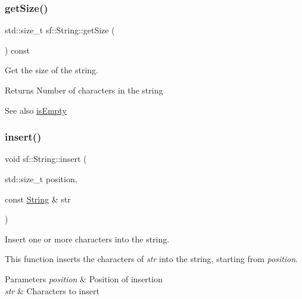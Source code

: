\subsubsection{\texorpdfstring{getSize()}{getSize()}}
{\footnotesize\ttfamily std\+::size\+\_\+t sf\+::\+String\+::get\+Size (\begin{DoxyParamCaption}{ }\end{DoxyParamCaption}) const}



Get the size of the string. 

\begin{DoxyReturn}{Returns}
Number of characters in the string
\end{DoxyReturn}
\begin{DoxySeeAlso}{See also}
\mbox{\hyperlink{classsf_1_1_string_a2ba26cb6945d2bbb210b822f222aa7f6}{is\+Empty}} \begin{DoxyVerb}\end{DoxyVerb}
 
\end{DoxySeeAlso}
\mbox{\label{classsf_1_1_string_ad0b1455deabf07af13ee79812e05fa02}} 
\subsubsection{\texorpdfstring{insert()}{insert()}}
{\footnotesize\ttfamily void sf\+::\+String\+::insert (\begin{DoxyParamCaption}\item[{std\+::size\+\_\+t}]{position,  }\item[{const \mbox{\hyperlink{classsf_1_1_string}{String}} \&}]{str }\end{DoxyParamCaption})}



Insert one or more characters into the string. 

This function inserts the characters of {\itshape str} into the string, starting from {\itshape position}.


\begin{DoxyParams}{Parameters}
{\em position} & Position of insertion \\
\hline
{\em str} & Characters to insert \begin{DoxyVerb}\end{DoxyVerb}
 \\
\hline
\end{DoxyParams}
\mbox{\label{classsf_1_1_string_a2ba26cb6945d2bbb210b822f222aa7f6}} 
